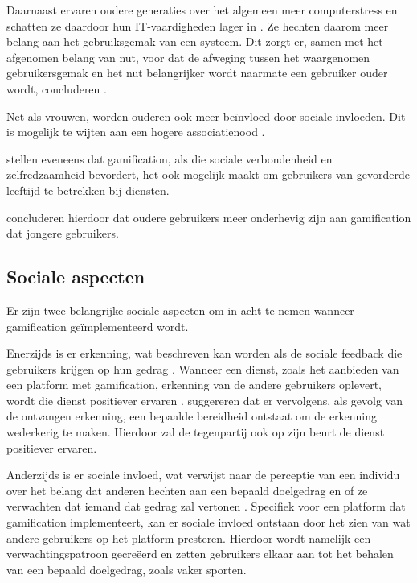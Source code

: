 Daarnaast ervaren oudere generaties over het algemeen meer computerstress en schatten ze daardoor hun IT-vaardigheden lager in \autocite{Chung2010}. Ze hechten daarom meer belang aan het gebruiksgemak van een systeem. Dit zorgt er, samen met het afgenomen belang van nut, voor dat de afweging tussen het waargenomen gebruikersgemak en het nut belangrijker wordt naarmate een gebruiker ouder wordt, concluderen \textcite{Melenhorst2001}.

Net als vrouwen, worden ouderen ook meer beïnvloed door sociale invloeden. Dit is mogelijk te wijten aan een hogere associatienood \autocite{Morris2000, Venkatesh2000, Wang2008}.

\textcite{Arning2007, Czaja2006} stellen eveneens dat gamification, als die sociale verbondenheid en zelfredzaamheid bevordert, het ook mogelijk maakt om gebruikers van gevorderde leeftijd te betrekken bij diensten.

\textcite{PoloPena2020} concluderen hierdoor dat oudere gebruikers meer onderhevig zijn aan gamification dat jongere gebruikers.

\subsection{Sociale aspecten}
\label{ssec:sociale_aspecen}
Er zijn twee belangrijke sociale aspecten om in acht te nemen wanneer gamification geïmplementeerd wordt.

Enerzijds is er erkenning, wat beschreven kan worden als de sociale feedback die gebruikers krijgen op hun gedrag \autocite{Cheung2011}.
Wanneer een dienst, zoals het aanbieden van een platform met gamification, erkenning van de andere gebruikers oplevert, wordt die dienst positiever ervaren \autocite{Preece2001}.
\textcite{Hamari2013} suggereren dat er vervolgens, als gevolg van de ontvangen erkenning, een bepaalde bereidheid ontstaat om de erkenning wederkerig te maken. Hierdoor zal de tegenpartij ook op zijn beurt de dienst positiever ervaren.

Anderzijds is er sociale invloed, wat verwijst naar de perceptie van een individu over het belang dat anderen hechten aan een bepaald doelgedrag en of ze verwachten dat iemand dat gedrag zal vertonen \autocite{Ajzen1991}. Specifiek voor een platform dat gamification implementeert, kan er sociale invloed ontstaan door het zien van wat andere gebruikers op het platform presteren. Hierdoor wordt namelijk een verwachtingspatroon gecreëerd en zetten gebruikers elkaar aan tot het behalen van een bepaald doelgedrag, zoals vaker sporten.

